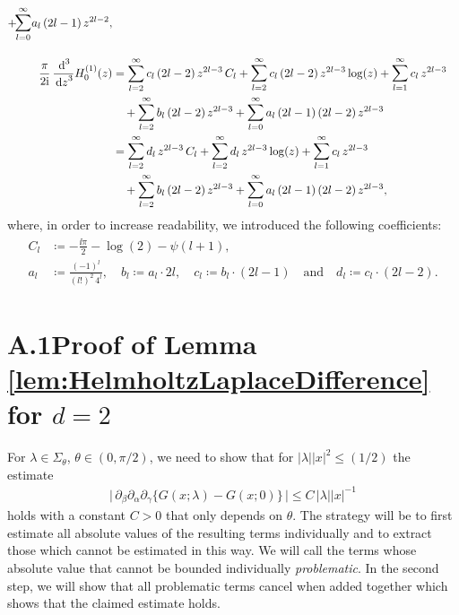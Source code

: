 \begin{align*}
  +  \!\mathlarger{\sum}_{l = 0}^\infty a_l \, (2l - 1) \, z^{2l - 2}, \\[1.0em]
  \frac{\pi}{2\ii} \, \frac{\d{}^3}{\d z^3} H_0^{(1)}(z)
  &= \sum_{l = 2}^\infty c_l \, (2l - 2) \, z^{2l - 3} \, C_l 
  +  \mathlarger{\sum}_{l = 2}^\infty \, c_l \, (2l - 2) \, z^{2l - 3} \log(z) 
  +  \mathlarger{\sum}_{l = 1}^\infty \, c_l \, z^{2l - 3} \\
 &\quad  
  + \mathlarger{\sum}_{l = 2}^\infty \, b_l \, (2l - 2) \, z^{2l - 3} 
  + \mathlarger{\sum}_{l = 0}^\infty \, a_l \, (2l - 1) \, (2l - 2) \, z^{2l - 3} \\
  &= \mathlarger{\sum}_{l = 2}^\infty \, d_l \, z^{2l - 3} \, C_l 
  + \mathlarger{\sum}_{l = 2}^\infty \, d_l \, z^{2l - 3} \log(z) 
  + \mathlarger{\sum}_{l = 1}^\infty \, c_l \, z^{2l - 3} \\
 &\quad  + \mathlarger{\sum}_{l = 2}^\infty \, b_l \, (2l - 2) \, z^{2l - 3} 
  + \mathlarger{\sum}_{l = 0}^\infty \, a_l \, (2l - 1)\, (2l - 2) \, z^{2l - 3} ,
\end{align*}
where, in order to increase readability, we introduced the following coefficients:
\begin{align}
  \begin{alignedat}{1}
  C_l &\coloneqq -\frac{\ii \pi}{2} - \log(2) - \psi(l + 1), \\
  a_l &\coloneqq \frac{(-1)^l}{(l!)^2 \, 4^l}, \quad
  b_l \coloneqq a_l \cdot  2l, \quad
  c_l \coloneqq b_l \cdot (2l - 1) \quad\text{and}\quad
  d_l \coloneqq c_l \cdot (2l - 2).
  \end{alignedat}\label{defnConst}\tag{D1}
\end{align}

\section*{A.1\quad Proof of Lemma \ref{lem:HelmholtzLaplaceDifference} for $d = 2$}
\label{sec:A1}

For $\lambda \in \Sigma_\theta$, $\theta \in (0, \pi/2)$, we need to show that for $|\lambda| |x|^2 \leq (1/2)$ the estimate
\begin{align*}
  \Big|\, \partial_\beta \partial_\alpha \partial_\gamma \big\{ G(x; \lambda) - G(x; 0) \big\} \, \Big|
  \leq C\, |\lambda| |x|^{-1}
\end{align*}
holds with a constant $C > 0$ that only depends on $\theta$.
The strategy will be to first estimate all absolute values of the resulting terms individually and to extract those which cannot be estimated in this way.
We will call the terms whose absolute value that cannot be bounded individually \emph{problematic}.
In the second step, we will show that all problematic terms cancel when added together which shows that the claimed estimate holds.

